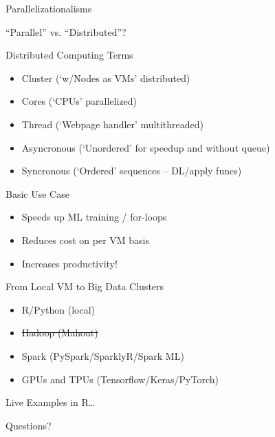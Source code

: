 \documentclass[ignorenonframetext,]{beamer}
\providecommand{\tightlist}{%
  \setlength{\itemsep}{0pt}\setlength{\parskip}{0pt}}
\begin{document}
\begin{frame}{Parallelizationalisms}
\begin{block}{``Parallel'' vs. ``Distributed''?}
\end{block}

\begin{block}{Distributed Computing Terms}

\begin{itemize}
\tightlist
\item
  Cluster (`w/Nodes as VMs' distributed)
\item
  Cores (`CPUs' parallelized)
\item
  Thread (`Webpage handler' multithreaded)
\item
  Asyncronous (`Unordered' for speedup and without queue)
\item
  Syncronous (`Ordered' sequences -- DL/apply funcs)
\end{itemize}

\end{block}

\begin{block}{Basic Use Case}

\begin{itemize}
\tightlist
\item
  Speeds up ML training / for-loops
\item
  Reduces cost on per VM basis
\item
  Increases productivity!
\end{itemize}

\end{block}

\begin{block}{From Local VM to Big Data Clusters}

\begin{itemize}
\tightlist
\item
  R/Python (local)
\item
  \sout{Hadoop (Mahout)}
\item
  Spark (PySpark/SparklyR/Spark ML)
\item
  GPUs and TPUs (Tensorflow/Keras/PyTorch)
\end{itemize}

\end{block}

\end{frame}

\begin{frame}{Live Examples in R\ldots{}}

\end{frame}

\begin{frame}{Questions?}

\end{frame}
\end{document}
